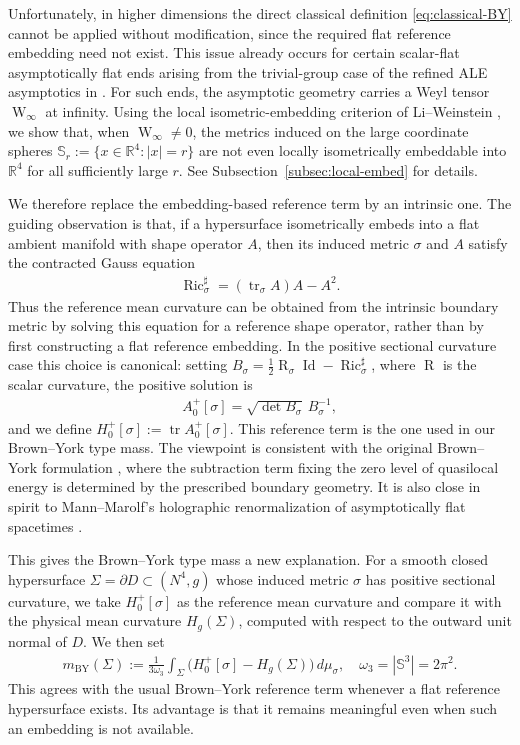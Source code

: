 \documentclass[10pt,a4paper]{amsart}
\newcommand{\R}{\mathbb{R}}
\newcommand{\Sph}{\mathbb{S}}
\newcommand{\tr}{\operatorname{tr}}
\newcommand{\Ric}{\operatorname{Ric}}
\newcommand{\Weyl}{\operatorname{W}}
\newcommand{\Id}{\operatorname{Id}}
\newcommand{\Scal}{\operatorname{R}}
\newcommand{\BY}{\mathrm{BY}}
\begin{document}
	Unfortunately, in higher dimensions the direct classical definition
	\eqref{eq:classical-BY} cannot be applied without modification, since the
	required flat reference embedding need not exist.  This issue already occurs
	for certain scalar-flat asymptotically flat ends arising from the
	trivial-group case of the refined ALE asymptotics in \cite{YouALE26}.  For
	such ends, the asymptotic geometry carries a Weyl tensor
	$\Weyl_\infty$ at infinity.  Using the local isometric-embedding criterion
	of Li--Weinstein \cite{LiWeinstein}, we show that, when
	$\Weyl_\infty\neq0$, the metrics induced on the large coordinate spheres
	$\Sph_r:=\{x\in\R^4:|x|=r\}$ are not even locally isometrically embeddable
	into $\R^4$ for all sufficiently large $r$.  See
	Subsection~\ref{subsec:local-embed} for details.
	
	We therefore replace the embedding-based reference term by an intrinsic one.
	The guiding observation is that, if a hypersurface isometrically embeds into a
	flat ambient manifold with shape operator $A$, then its induced metric $\sigma$
	and $A$ satisfy the contracted Gauss equation
	\begin{align*}
		\Ric_\sigma^\sharp
		=
		(\tr_\sigma A)A-A^2 .
	\end{align*}
	Thus the reference mean curvature can be obtained from the intrinsic
	boundary metric by solving this equation for a reference shape operator, rather
	than by first constructing a flat reference embedding. In the positive sectional
	curvature case this choice is canonical: setting
	$B_\sigma=\frac12\Scal_\sigma\Id-\Ric_\sigma^\sharp$, where $\Scal$ is the scalar curvature, the positive solution is
	\begin{align*}
		A_0^+[\sigma]
		=
		\sqrt{\det B_\sigma}\,B_\sigma^{-1},
	\end{align*}
	and we define $H_0^+[\sigma]:=\tr A_0^+[\sigma]$. This reference term is the one
	used in our Brown--York type mass. The viewpoint is consistent with the original
	Brown--York formulation \cite{BrownYork}, where the subtraction term fixing the
	zero level of quasilocal energy is determined by the prescribed boundary
	geometry. It is also close in spirit to Mann--Marolf's holographic
	renormalization of asymptotically flat spacetimes \cite{MannMarolf}.
	
	This gives the Brown--York type mass a new explanation. For a smooth closed
	hypersurface $\Sigma=\partial D\subset (N^4,g)$ whose induced metric
	$\sigma$ has positive sectional curvature, we take
	$H_0^+[\sigma]$ as the reference mean curvature and compare
	it with the physical mean curvature $H_g(\Sigma)$, computed with respect to
	the outward unit normal of $D$. We then set
	\begin{align}\label{eq:Brown-York-type-mass-introduction}
		m_{\BY}(\Sigma)
		:=
		\frac{1}{3\omega_3}
		\int_\Sigma
		\bigl(
		H_0^+[\sigma]-H_g(\Sigma)
		\bigr)\,d\mu_\sigma,
		\quad
		\omega_3=|\Sph^3|=2\pi^2 .
	\end{align}
	This agrees with the usual Brown--York reference term whenever a
	flat reference hypersurface exists. Its advantage is that it remains meaningful even when such an
	embedding is not available.
	
\end{document}
